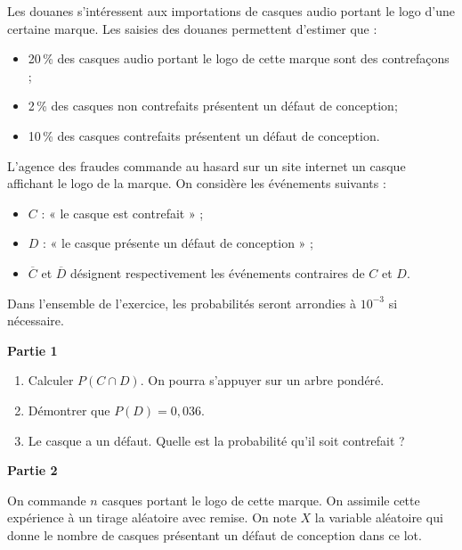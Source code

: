 Les douanes s'intéressent aux importations de casques audio portant le logo d'une certaine marque. Les saisies des douanes permettent d'estimer que :
%
\begin{itemize}
	\item 20\,\% des casques audio portant le logo de cette marque sont des contrefaçons ;
	\item 2\,\% des casques non contrefaits présentent un défaut de conception; 
	\item 10\,\% des casques contrefaits présentent un défaut de conception.
\end{itemize}

L'agence des fraudes commande au hasard sur un site internet un casque affichant le logo de la marque. On considère les événements suivants : 

\begin{itemize}
	\item $C$ : « le casque est contrefait » ;
	\item $D$ : « le casque présente un défaut de conception » ;
	\item $\overline{C}$ et $\overline{D}$ désignent respectivement les événements contraires de $C$ et $D$.
\end{itemize}

Dans l'ensemble de l'exercice, les probabilités seront arrondies à $10^{-3}$ si nécessaire.

\medskip

\textbf{Partie 1}

\begin{enumerate}
	\item Calculer $P(C \cap D)$. On pourra s'appuyer sur un arbre pondéré. 
	\item Démontrer que $P(D)=0,036$.
	\item Le casque a un défaut. Quelle est la probabilité qu'il soit contrefait ?
\end{enumerate}

\textbf{Partie 2}

\medskip

On commande $n$ casques portant le logo de cette marque. On assimile cette expérience 
à un tirage aléatoire avec remise. On note $X$ la variable aléatoire qui donne le nombre de casques présentant un défaut de conception dans ce lot.

